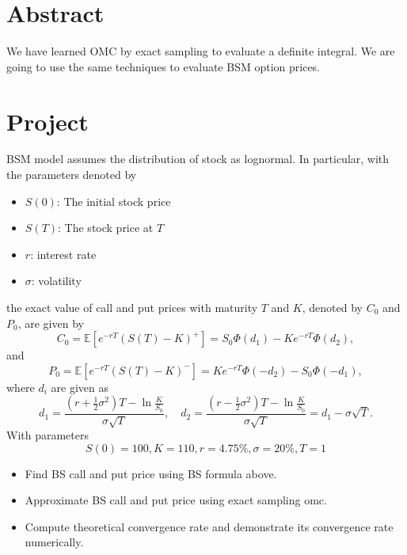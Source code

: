 \documentclass{article}
\begin{document}
\section{Abstract}
We have learned OMC by exact sampling to evaluate a definite integral.
We are going to use the same techniques to evaluate BSM option prices.

\section{Project}
BSM model assumes the distribution of stock as lognormal. In particular, with the parameters denoted by
\begin{itemize}
 \item  $S(0)$: The initial stock price
 \item
 $S(T)$: The stock price at $T$
 \item
 $r$: interest rate
 \item $\sigma$: volatility
\end{itemize}
the exact value of call and put prices with maturity $T$ and $K$, denoted by $C_0$ and $P_0$, are given by
$$C_0 = \mathbb E [e^{-rT} (S(T) - K)^+] = S_0  \Phi(d_1) - K e^{-rT} \Phi(d_2),$$
and 
$$P_0 = \mathbb E [e^{-rT} (S(T) - K)^-] = K e^{-rT} \Phi(- d_2) - S_0  \Phi(- d_1),$$
where $d_i$ are given as
$$d_1 = \frac{(r + \frac 1 2 \sigma^2) T - \ln \frac{K}{S_0}}{\sigma \sqrt T}, 
\quad 
d_2 = \frac{(r - \frac 1 2 \sigma^2) T - \ln \frac{K}{S_0}}{\sigma \sqrt T} = d_1 - \sigma \sqrt T.$$
With parameters $$S(0) = 100, K = 110, r = 4.75\%, \sigma = 20\%, T = 1$$
\begin{itemize}
 \item Find BS call and put price using BS formula above.
 \item Approximate BS call and put price using exact sampling omc.
 \item Compute theoretical convergence rate and demonstrate its convergence rate numerically.
\end{itemize}
\end{document}
